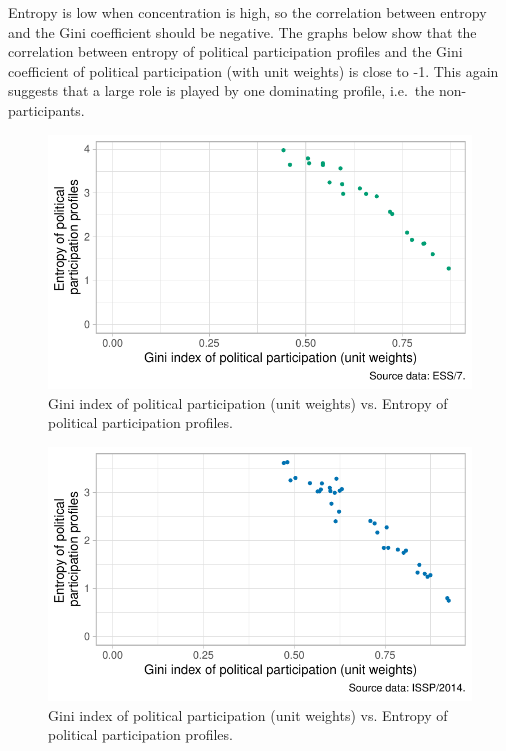 \documentclass[12pt,]{article}
\begin{document}
Entropy is low when concentration is high, so the correlation between entropy and the Gini coefficient should be negative. The graphs below show that the correlation between entropy of political participation profiles and the Gini coefficient of political participation (with unit weights) is close to -1. This again suggests that a large role is played by one dominating profile, i.e.~the non-participants.

\begin{figure}[H]

{\centering \includegraphics{report_files/figure-latex/ess-entropy-1} 

}

\caption{Gini index of political participation (unit weights) vs. Entropy of political participation profiles.}\label{fig:ess-entropy}
\end{figure}

\begin{figure}[H]

{\centering \includegraphics{report_files/figure-latex/issp-entropy-1} 

}

\caption{Gini index of political participation (unit weights) vs. Entropy of political participation profiles.}\label{fig:issp-entropy}
\end{figure}
\end{document}
